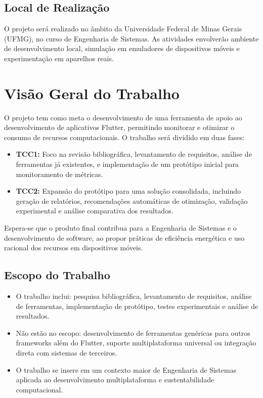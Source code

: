 \documentclass[12pt,a4paper]{article}
\begin{document}
\subsection{Local de Realização}
O projeto será realizado no âmbito da Universidade Federal de Minas Gerais (UFMG), no curso de Engenharia de Sistemas. As atividades envolverão ambiente de desenvolvimento local, simulação em emuladores de dispositivos móveis e experimentação em aparelhos reais.


\section{Visão Geral do Trabalho}

O projeto tem como meta o desenvolvimento de uma ferramenta de apoio ao desenvolvimento de aplicativos Flutter, permitindo monitorar e otimizar o consumo de recursos computacionais. O trabalho será dividido em duas fases:  

\begin{itemize}
    \item \textbf{TCC1:} Foco na revisão bibliográfica, levantamento de requisitos, análise de ferramentas já existentes, e implementação de um protótipo inicial para monitoramento de métricas.
    \item \textbf{TCC2:} Expansão do protótipo para uma solução consolidada, incluindo geração de relatórios, recomendações automáticas de otimização, validação experimental e análise comparativa dos resultados.
\end{itemize}

Espera-se que o produto final contribua para a Engenharia de Sistemas e o desenvolvimento de software, ao propor práticas de eficiência energética e uso racional dos recursos em dispositivos móveis.

\subsection{Escopo do Trabalho}
\begin{itemize}
    \item O trabalho inclui: pesquisa bibliográfica, levantamento de requisitos, análise de ferramentas, implementação de protótipo, testes experimentais e análise de resultados.
    \item Não estão no escopo: desenvolvimento de ferramentas genéricas para outros frameworks além do Flutter, suporte multiplataforma universal ou integração direta com sistemas de terceiros.
    \item O trabalho se insere em um contexto maior de Engenharia de Sistemas aplicada ao desenvolvimento multiplataforma e sustentabilidade computacional.
\end{itemize}
\end{document}
